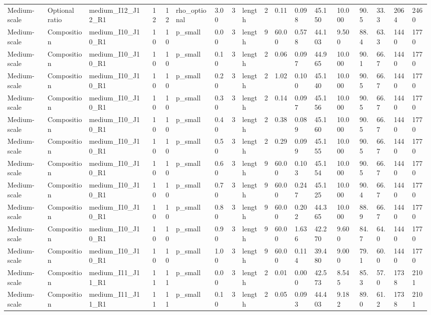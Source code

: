 \begin{longtable}{lllrrllllrllllllll}
Medium-scale & Optional ratio & medium\_I12\_J12\_R1 & 12 & 12 & rho\_optional & 3.00 & 3 & length & 2 & 0.11 & 0.098 & 45.150 & 10.000 & 90.5 & 33.3 & 2064 & 2460 \\
Medium-scale & Composition & medium\_I10\_J10\_R1 & 10 & 10 & p\_small & 0.00 & 3 & length & 9 & 60.00 & 0.578 & 44.103 & 9.500 & 88.4 & 63.3 & 1440 & 1770 \\
Medium-scale & Composition & medium\_I10\_J10\_R1 & 10 & 10 & p\_small & 0.10 & 3 & length & 2 & 0.06 & 0.097 & 44.965 & 10.000 & 90.1 & 66.7 & 1440 & 1770 \\
Medium-scale & Composition & medium\_I10\_J10\_R1 & 10 & 10 & p\_small & 0.20 & 3 & length & 2 & 1.02 & 0.100 & 45.140 & 10.000 & 90.5 & 66.7 & 1440 & 1770 \\
Medium-scale & Composition & medium\_I10\_J10\_R1 & 10 & 10 & p\_small & 0.30 & 3 & length & 2 & 0.14 & 0.097 & 45.156 & 10.000 & 90.5 & 66.7 & 1440 & 1770 \\
Medium-scale & Composition & medium\_I10\_J10\_R1 & 10 & 10 & p\_small & 0.40 & 3 & length & 2 & 0.38 & 0.089 & 45.160 & 10.000 & 90.5 & 66.7 & 1440 & 1770 \\
Medium-scale & Composition & medium\_I10\_J10\_R1 & 10 & 10 & p\_small & 0.50 & 3 & length & 2 & 0.29 & 0.099 & 45.155 & 10.000 & 90.5 & 66.7 & 1440 & 1770 \\
Medium-scale & Composition & medium\_I10\_J10\_R1 & 10 & 10 & p\_small & 0.60 & 3 & length & 9 & 60.00 & 0.103 & 45.154 & 10.000 & 90.5 & 66.7 & 1440 & 1770 \\
Medium-scale & Composition & medium\_I10\_J10\_R1 & 10 & 10 & p\_small & 0.70 & 3 & length & 9 & 60.00 & 0.247 & 45.125 & 10.000 & 90.4 & 66.7 & 1440 & 1770 \\
Medium-scale & Composition & medium\_I10\_J10\_R1 & 10 & 10 & p\_small & 0.80 & 3 & length & 9 & 60.00 & 0.202 & 44.365 & 10.000 & 88.9 & 66.7 & 1440 & 1770 \\
Medium-scale & Composition & medium\_I10\_J10\_R1 & 10 & 10 & p\_small & 0.90 & 3 & length & 9 & 60.00 & 1.636 & 42.270 & 9.600 & 84.7 & 64.0 & 1440 & 1770 \\
Medium-scale & Composition & medium\_I10\_J10\_R1 & 10 & 10 & p\_small & 1.00 & 3 & length & 9 & 60.00 & 0.114 & 39.480 & 9.000 & 79.1 & 60.0 & 1440 & 1770 \\
Medium-scale & Composition & medium\_I11\_J11\_R1 & 11 & 11 & p\_small & 0.00 & 3 & length & 2 & 0.01 & 0.000 & 42.573 & 8.545 & 85.3 & 57.0 & 1738 & 2101 \\
Medium-scale & Composition & medium\_I11\_J11\_R1 & 11 & 11 & p\_small & 0.10 & 3 & length & 2 & 0.05 & 0.093 & 44.403 & 9.182 & 89.0 & 61.2 & 1738 & 2101 \\

\end{longtable}
